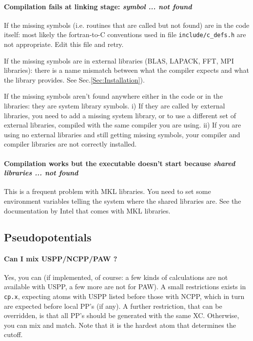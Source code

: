 \documentclass[12pt,a4paper]{article}
\def\cpx{\texttt{cp.x}}
\begin{document}
\paragraph{Compilation fails at linking stage: {\em symbol ... not found}}
If the missing symbols (i.e. routines that are called but not found)
are in the code itself: most likely the fortran-to-C conventions used
in file \texttt{include/c\_defs.h} are not appropriate. Edit this file
and retry.

If the missing symbols are in external libraries (BLAS, LAPACK, FFT,
MPI libraries): 
there is a name mismatch between what the compiler expects and what the
library provides. See Sec.\ref{Sec:Installation}).

If the missing symbols aren't found anywhere either in the code or in the
libraries: they are system library symbols. i) If they are called by external 
libraries, you need to add a missing system library, or to use a different 
set of external libraries, compiled with the same compiler you are using. 
ii) If you are using no external libraries and still getting missing symbols, 
your compiler and compiler libraries are not correctly installed.

\paragraph{Compilation works but the executable doesn't start because
{\em shared libraries ... not found}}
This is a frequent problem with MKL libraries. You need to set some
environment variables telling the system where the shared libraries are.
See the documentation by Intel that comes with MKL libraries.

\subsection{Pseudopotentials}

\paragraph{Can I mix USPP/NCPP/PAW ?}

Yes, you can (if implemented, of course: a few kinds of calculations
are not available with USPP, a few more are not for PAW). A small
restrictions exists in \cpx, expecting atoms with USPP listed before 
those with NCPP, which in turn are expected before local PP's (if any).
A further restriction, that can be overridden,
is that all PP's should be generated with the same XC.
Otherwise, you can mix and match. Note that 
it is the hardest atom that determines the cutoff.
\end{document}
